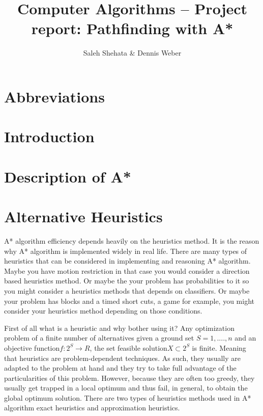 \documentclass[12pt]{article}
\begin{document}
	
\title{Computer Algorithms -- Project report: Pathfinding with A*}
\author{Saleh Shehata \& Dennis Weber}
\maketitle

\begin{abstract}
\end{abstract}

\section*{Abbreviations}
\begin{acronym}[SIFT]
	\setlength{\parskip}{0ex}
	\setlength{\itemsep}{1ex}
\end{acronym}

\section{Introduction}

\section{Description of A*}

\section{Alternative Heuristics}
A* algorithm efficiency depends heavily on the heuristics method. It is the reason why A* algorithm is implemented widely in real life. There are many types of heuristics that can be considered in implementing and reasoning A* algorithm. Maybe you have motion restriction in that case you would consider a direction based heuristics method. Or maybe the your problem has probabilities to it so you might consider a heuristics methods that depends on classifiers. Or maybe your problem has blocks and a timed short cuts, a game for example, you might consider your heuristics method depending on those conditions.

First of all what is a heuristic and why bother using it? Any optimization problem of a finite number of alternatives given a ground set \begin{math} S = {1,....,n} \end{math} and an objective function\begin{math} f : 2^S \rightarrow R\end{math}, the set feasible solution\begin{math} X \subset 2^S\end{math} is finite. Meaning that heuristics are problem-dependent techniques. As such, they usually are adapted to the problem at hand and they try to take full advantage of the particularities of this problem. However, because they are often too greedy, they usually get trapped in a local optimum and thus fail, in general, to obtain the global optimum solution. There are two types of heuristics methods used in A* algorithm exact heuristics and approximation heuristics.
\end{document}
